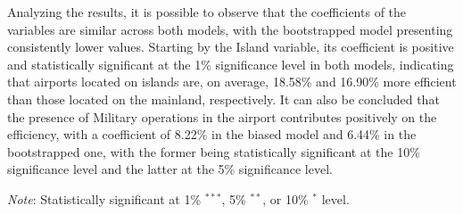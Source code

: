 Analyzing the results, it is possible to observe that the coefficients of the variables are similar across
both models, with the bootstrapped model presenting consistently lower values. Starting by the Island
variable, its coefficient is positive and statistically significant at the 1\% significance level in both models,
indicating that airports located on islands are, on average, 18.58\% and 16.90\% more efficient than
those located on the mainland, respectively. It can also be concluded that the presence of Military operations in the airport contributes positively
on the efficiency, with a coefficient of 8.22\% in the biased model and 6.44\% in the bootstrapped one, with
the former being statistically significant at the 10\% significance level and the latter at the 5\% significance
level.
\begin{table}[h!]
\centering
\caption{Truncated regression results.}
\label{tab:regression_results}
\begin{flushleft}
\footnotesize
\textit{Note}: Statistically significant at 1\% $^{***}$, 5\% $^{**}$, or 10\% $^{*}$ level.
\end{flushleft}
\end{table}

